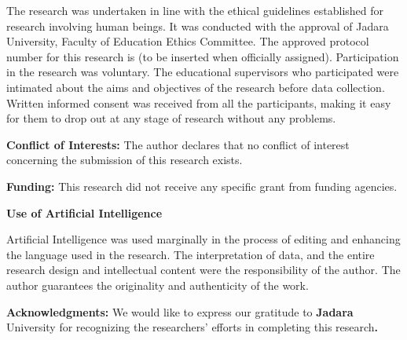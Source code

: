 \documentclass[10pt]{NSP1}
\begin{document}
The research was undertaken in line with the ethical guidelines established for research involving human beings. It was conducted with the approval of Jadara University, Faculty of Education Ethics Committee. The approved protocol number for this research is (to be inserted when officially assigned). Participation in the research was voluntary. The educational supervisors who participated were intimated about the aims and objectives of the research before data collection. Written informed consent was received from all the participants, making it easy for them to drop out at any stage of research without any problems.

\textbf{Conflict of Interests:} The author declares that no conflict of interest concerning the submission of this research exists.

\textbf{Funding:} This research did not receive any specific grant from funding agencies.

\textbf{Use of Artificial Intelligence}

Artificial Intelligence was used marginally in the process of editing and enhancing the language used in the research. The interpretation of data, and the entire research design and intellectual content were the responsibility of the author. The author guarantees the originality and authenticity of the work.

\textbf{Acknowledgments:} We would like to express our gratitude to \textbf{Jadara} University for recognizing the researchers' efforts in completing this research\textbf{.}

\subsection{}
\end{document}
